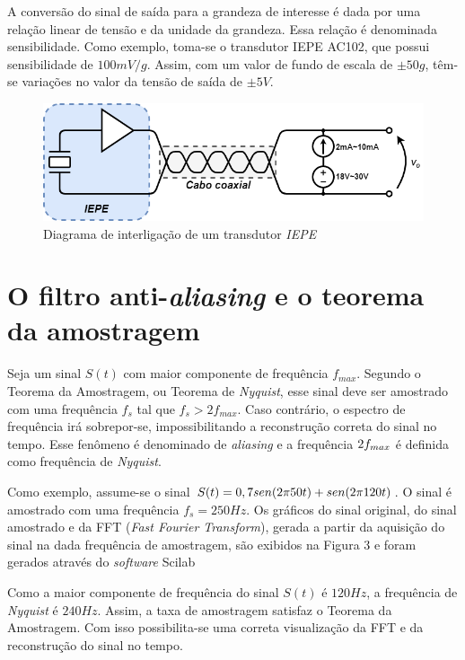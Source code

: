 \documentclass[11pt]{abntex2}
\begin{document}
				A conversão do sinal de saída para a grandeza de interesse é dada
				por uma relação linear de tensão e da unidade da grandeza. Essa
				relação é denominada sensibilidade. Como exemplo, toma-se o
				transdutor IEPE AC102, que possui sensibilidade de $100mV/g$.
				Assim, com um valor de fundo de escala de $\pm50g$, têm-se variações
				no valor da tensão de saída de $\pm5V$.\cite{ctc}
				\newpage

				\begin{figure}[H]
					\centering
					\includegraphics[width=\linewidth]{../../Fotos/Diagramas/iepe.png}
					\caption{Diagrama de interligação de um transdutor \textit{IEPE}}
				\end{figure}

			\section{O filtro anti-\textit{aliasing} e o teorema da amostragem}
				Seja um sinal $S(t)$ com maior componente de frequência
				$f_{max}$. Segundo o Teorema da Amostragem, ou Teorema de
				\textit{Nyquist}, esse sinal deve ser amostrado com uma
				frequência $f_s$ tal que $f_s>2f_{max}$. Caso contrário, o
				espectro de frequência irá sobrepor-se, impossibilitando a
				reconstrução correta do sinal no tempo. Esse fenômeno é denominado
				de \textit{aliasing} e a frequência $2\*f_{max}$ é definida como
				frequência de \textit{Nyquist}. \cite{nyquist}

				Como exemplo, assume-se o sinal $S(t) = 0,7\*sen(2\*\pi\*50\*t)
				+ sen(2\*\pi\*120\*t)$. O sinal é amostrado com uma frequência
				$f_s = 250Hz$. Os gráficos do sinal original, do sinal
				amostrado e da FFT (\textit{Fast Fourier Transform}), gerada a
				partir da aquisição do sinal na dada frequência de amostragem,
				são exibidos na Figura 3 e foram gerados através do
				\textit{software} Scilab

				Como a maior componente de frequência do sinal $S(t)$ é $120Hz$,
				a frequência de \textit{Nyquist} é $240Hz$. Assim, a taxa de
				amostragem satisfaz o Teorema da Amostragem. Com isso possibilita-se
				uma correta visualização da FFT e da reconstrução do sinal no tempo.
\end{document}
